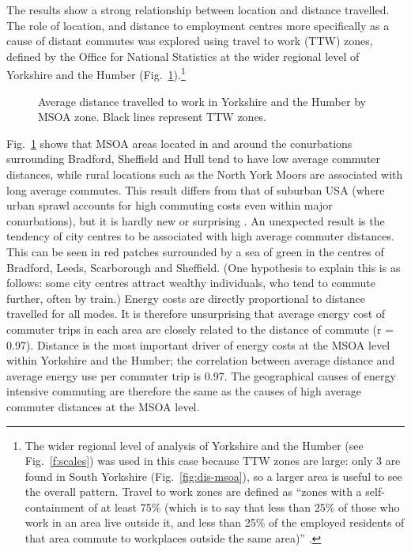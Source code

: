 The results show a strong relationship between location and
 distance travelled.
The role of location, and distance to employment centres
more specifically as a cause of distant
commutes was explored using travel to work (TTW) zones, defined by the Office
for National Statistics at the wider regional level of Yorkshire and the Humber
(Fig.~\ref{fig:map1}).\footnote{The
wider regional level of analysis of
Yorkshire and the Humber (see Fig.~\ref{f:scales}) was used in this case
because TTW zones are large: only 3 are found in South Yorkshire
(Fig.~\ref{fig:dis-msoa}), so a larger area is useful to see the overall
pattern. Travel to work zones are defined as ``zones with a self- containment of
at least 75\% (which is to say that less than 25\% of those who work in an area
live outside it, and less than 25\% of the employed residents of that area
commute to workplaces outside the same area)'' \citep{Coombes1982}.
}
\begin{figure}[h]
 \centering
 \caption[Average distance travelled to work in Yorkshire and the Humber]
 {Average distance travelled to work in Yorkshire and the Humber by MSOA
zone. Black lines represent TTW zones.}
 \label{fig:map1}
\end{figure}
Fig.~\ref{fig:map1} shows that MSOA areas located in and
around the conurbations surrounding Bradford, Sheffield and Hull tend to have
low average commuter distances, while rural locations such as the North
York Moors are associated with long average commutes. This result differs
from that of suburban USA (where urban sprawl accounts for high commuting costs
even within major conurbations), but it is hardly new or surprising
\citep{Marshall2008, Sexton2011}.
An unexpected result is the tendency of city centres to be associated
with high average commuter distances. This can be seen in red patches surrounded
by a sea of green in the centres of Bradford, Leeds, Scarborough and Sheffield.
(One hypothesis to explain this is as follows: some city centres attract
wealthy individuals, who tend to commute further, often by train.)
Energy costs are directly proportional to distance travelled for all
modes. It is therefore unsurprising that average energy cost of commuter trips in each area
are closely related to the distance of commute (r = 0.97).
Distance is the most important driver of energy costs at the MSOA level within
Yorkshire and the Humber; the correlation between average distance and average
energy use per commuter trip is 0.97.
The
geographical causes of energy intensive commuting are therefore the same as the
causes of high average commuter distances at the MSOA level.

